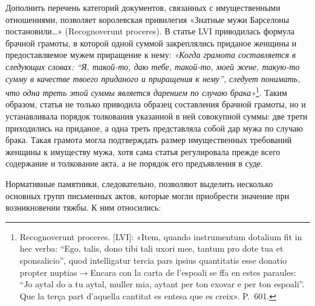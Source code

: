 Дополнить перечень категорий документов, связанных с имущественными отношениями, позволяет королевская привилегия «Знатные мужи Барселоны постановили…» (Recognoverunt proceres). В статье LVI приводилась формула брачной грамоты, в которой одной суммой закреплялись приданое женщины и предоставляемое мужем приращение к нему: \emph{«Когда грамота составляется в следующих словах: “Я, такой-то, даю тебе, такой-то, моей жене, такую-то сумму в качестве твоего приданого и приращения к нему”, следует понимать, что одна треть этой суммы является дарением по случаю брака»}\footnote{Recognoverunt proceres. [LVI]: «Item, quando instrumentum dotalium fit in hec verba: “Ego, talis, dono tibi tali uxori mee, tantum pro dote tua et sponsalicio”, quod intelligatur tercia pars ipsius quantitatis esse donatio propter nuptias$\rightarrow$Encara con la carta de l’espoali se ffa en estes paraules: “Jo aytal do a tu aytal, muller mia, aytant per ton exovar e per ton espoali”. Que la terça part d’aquella cantitat es entesa que es creix». P.~601.}. Таким образом, статья не только приводила образец составления брачной грамоты, но и устанавливала порядок толкования указанной в ней совокупной суммы: две трети приходились на приданое, а одна треть представляла собой дар мужа по случаю брака. Такая грамота могла подтверждать размер имущественных требований женщины к имуществу мужа, хотя сама статья регулировала прежде всего содержание и толкование акта, а не порядок его предъявления в суде.

Нормативные памятники, следовательно, позволяют выделить несколько основных групп письменных актов, которые могли приобрести значение при возникновении тяжбы. К ним относились:

